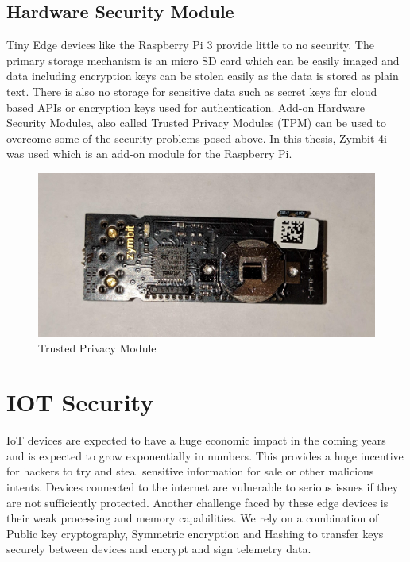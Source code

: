 \documentclass[11pt,openright]{report}
\begin{document}
\subsection{Hardware Security Module}
Tiny Edge devices like the Raspberry Pi 3 provide little to no security.
The primary storage mechanism is an micro SD card which can be easily imaged and data including encryption keys can be stolen easily as the data is stored as plain text. There is also no storage for sensitive data such as secret keys for cloud based APIs or encryption keys used for authentication. Add-on Hardware Security Modules, also called Trusted Privacy Modules (TPM) can be used to overcome some of the security problems posed above. In this thesis, Zymbit 4i was used which is an add-on module for the Raspberry Pi.

\begin{figure}
	\centering
	\includegraphics[scale=0.1]{images/tpm.jpg}
	\caption{Trusted Privacy Module}
	\label{fig:tpm}
\end{figure}


\section{IOT Security}
IoT devices are expected to have a huge economic impact in the coming years and is expected to grow exponentially in numbers. This provides a huge incentive for hackers to try and steal sensitive information for sale or other malicious intents. Devices connected to the internet are vulnerable to serious issues if they are not sufficiently protected. Another challenge faced by these edge devices is their weak processing and memory capabilities. We rely on a combination of Public key cryptography, Symmetric encryption and Hashing to transfer keys securely between devices and encrypt and sign telemetry data. 
\end{document}
